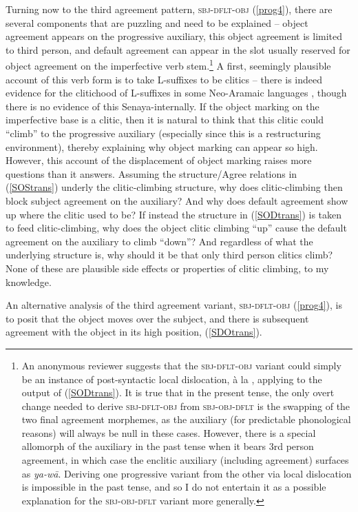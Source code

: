 \documentclass[output=paper
,modfonts
,nonflat]{langsci/langscibook}
\begin{document}
Turning now to the third agreement pattern, \textsc{sbj-dflt-obj} (\ref{prog4}), there are several components that are puzzling and need to be explained -- object agreement appears on the progressive auxiliary, this object agreement is limited to third person, and default agreement can appear in the slot usually reserved for object agreement on the imperfective verb stem.\footnote{An anonymous reviewer suggests that the \textsc{sbj-dflt-obj} variant could simply be an instance of post-syntactic local dislocation, à la \citet{EmbickNoyer01}, applying to the output of (\ref{SODtrans}). It is true that in the present tense, the only overt change needed to derive \textsc{sbj-dflt-obj} from \textsc{sbj-obj-dflt} is the swapping of the two final agreement morphemes, as the auxiliary (for predictable phonological reasons) will always be null in these cases. However, there is a special allomorph of the auxiliary in the past tense when it bears 3rd person agreement, in which case the enclitic auxiliary (including agreement) surfaces as \textit{ya-w\=a}. Deriving one progressive variant from the other via local dislocation is impossible in the past tense, and so I do not entertain it as a possible explanation for the \textsc{sbj-obj-dflt} variant more generally.} A first, seemingly  plausible account of this verb form is to take L-suffixes to be clitics -- there is indeed evidence for the clitichood of L-suffixes in some Neo-Aramaic languages \citep{DoronKhan12}, though there is no evidence of this Senaya-internally. If the object marking on the imperfective base is a clitic, then it is natural to think that this clitic could ``climb'' to the progressive auxiliary (especially since this is a restructuring environment), thereby explaining why object marking can appear so high. However, this account of the displacement of object marking raises more questions than it answers. Assuming the structure/Agree relations in (\ref{SOStrans}) underly the clitic-climbing structure, why does clitic-climbing then block subject agreement on the auxiliary? And why does default agreement show up where the clitic used to be? If instead the structure in (\ref{SODtrans}) is taken to feed clitic-climbing, why does the object clitic climbing ``up'' cause the default agreement on the auxiliary to climb ``down''? And regardless of what the underlying structure is, why should it be that only third person clitics climb? None of these are plausible side effects or properties of clitic climbing, to my knowledge.

An alternative analysis of the third agreement variant, \textsc{sbj-dflt-obj} (\ref{prog4}), is to posit that the object moves over the subject, and there is subsequent agreement with the object in its high position, (\ref{SDOtrans}).
\end{document}
